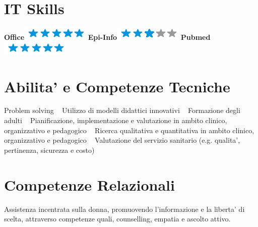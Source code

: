 \documentclass[11pt]{friggeri-cv}
\begin{document}
\begin{aside}
  \section{IT Skills}
  \textbf{Office}\includegraphics[scale=0.40]{img/5stars.png}
  \textbf{Epi-Info}\includegraphics[scale=0.40]{img/3stars.png}
  \textbf{Pubmed}\includegraphics[scale=0.40]{img/5stars.png}
  \section{Abilita' e Competenze Tecniche}\footnotesize{
    Problem solving 
    ~
    Utilizzo di modelli didattici innovativi
    ~
    Formazione degli adulti
    ~
    Pianificazione, implementazione e valutazione in ambito clinico, organizzativo e 
    pedagogico 
    ~
    Ricerca qualitativa e quantitativa in ambito clinico, organizzativo e pedagogico 
    ~
    Valutazione del servizio sanitario (e.g. qualita', pertinenza, sicurezza e 
    costo)}
  \section{Competenze Relazionali}\footnotesize{
  Assistenza incentrata sulla donna, promuovendo l'informazione e la 
  liberta' di scelta, attraverso competenze quali, counselling, empatia e 
  ascolto attivo.}
\end{aside}
\end{document}
